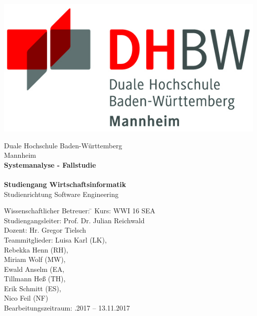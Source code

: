 \begin{titlepage}
\begin{minipage}{\textwidth}
		\vspace{-2cm}
		\noindent  
		\centering \includegraphics{img/logo.jpg}
\end{minipage}
\vspace{1em}
\sffamily
\begin{center}
	\textsf{\large{}Duale Hochschule Baden-W\"urttemberg\\[1.5mm] Mannheim}\\[2em]
	\textsf{\textbf{\Large{}Systemanalyse - Fallstudie}}\\[3mm]
	\textsf{\textbf{\DerTitelDerArbeit}} \\[1.5cm]
	\textsf{\textbf{\Large{}Studiengang Wirtschaftsinformatik}\\[3mm] \textsf{Studienrichtung Software Engineering}}
	
	\vspace{5em}

\begin{minipage}{\textwidth}

\begin{tabbing}
	Wissenschaftlicher Betreuer:
	\hspace{0.5cm}\=\kill
	Kurs: \> WWI 16 SEA \\[1.5mm]
	Studiengangsleiter: \> Prof. Dr. Julian Reichwald  \\[1.5mm]
	Dozent: \> Hr. Gregor Tielsch  \\[1.5mm]
	Teammitglieder: \> Luisa Karl (LK), \\ \> Rebekka Henn (RH), \\ \> Miriam Wolf (MW), \\ \> Ewald Anselm (EA, \\ \> Tillmann Heß (TH), \\ \> Erik Schmitt (ES), \\ \> Nico Feil (NF) \\[1.5mm]
	Bearbeitungszeitraum: .2017 -- 13.11.2017
\end{tabbing}
\end{minipage}

\end{center}

\end{titlepage}